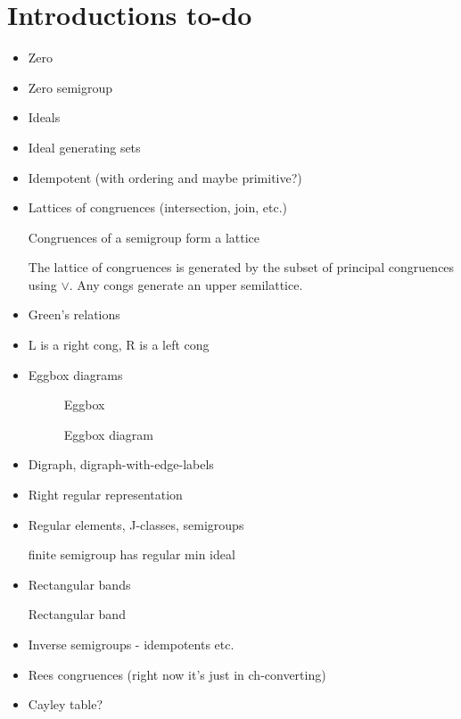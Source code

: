 \section{Introductions to-do}
\begin{itemize}
\item Zero
\item Zero semigroup
\item Ideals
\item Ideal generating sets \begin{definition}\label{def:ideal-generating-set}\end{definition}
\item Idempotent (with ordering and maybe primitive?)
\item Lattices of congruences (intersection, join, etc.)
  \begin{theorem}\label{thm:congruence-lattice}Congruences of a semigroup form a lattice\end{theorem}
  \begin{proposition}\label{prop:congruence-lattice-gens}The lattice of congruences is generated by the subset of principal congruences using $\vee$.  Any congs generate an upper semilattice.\end{proposition}
\item Green's relations
\item L is a right cong, R is a left cong
\item Eggbox diagrams \begin{figure}[h]Eggbox\caption{Eggbox diagram}\label{fig:eggbox-diagram}\end{figure}
\item Digraph, digraph-with-edge-labels
\item Right regular representation
\item Regular elements, J-classes, semigroups
  \begin{theorem}\label{thm:regular-min-ideal}finite semigroup has regular min ideal\end{theorem}
\item Rectangular bands
  \begin{definition}\label{def:rectangular-band}Rectangular band\end{definition}
\item Inverse semigroups - idempotents etc.
\item Rees congruences (right now it's just in ch-converting)
\item Cayley table?
\end{itemize}

